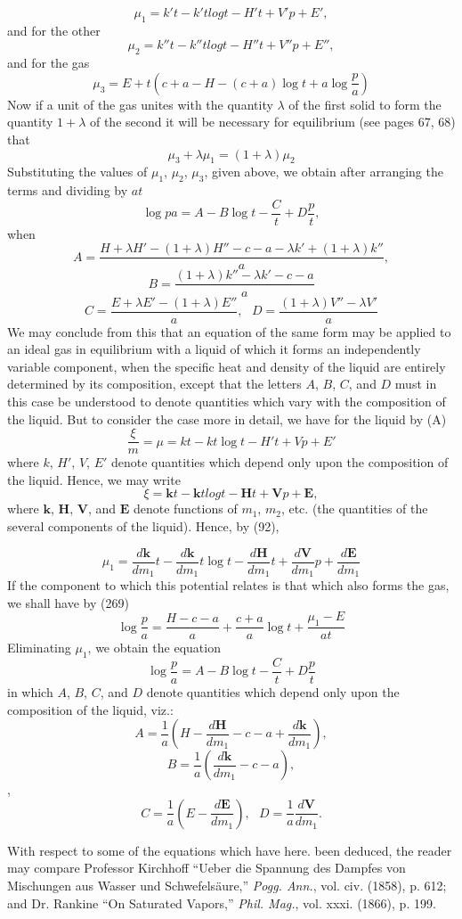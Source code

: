 \documentclass[12pt]{article}
\begin{document}
{$$\mu_1=  k't - k't log t - H't + V'p + E',$$
and for the other    
$$\mu_2= k''t - k''t log t - H''t + V''p + E'',$$
and for the gas      
$$\mu_3= E+t\left(c+a-H-(c+a) \log t+ a \log \frac{p}{a}\right)$$
Now if a unit of the gas unites with the quantity $\lambda$ of the first solid to form the quantity $1 +\lambda $ of the second it will be necessary for equilibrium (see pages 67, 68) that
$$ \mu_3 + \lambda \mu_1=(1 +\lambda) \mu_2$$
Substituting the values of $\mu_1$, $\mu_2$, $\mu_3$, given above, we obtain after arranging the terms and dividing by $at$
$$\log{p}{a} = A -B \log t -\frac{C}{t} + D \frac{p}{t},  $$
when    
$$ A= \frac{H+\lambda H' -(1 + \lambda)H''-c-a-\lambda k' + (1+\lambda)k''}{a},$$
$$B=\frac{(1+\lambda)k''-\lambda k' -c - a}{a}$$
$$C= \frac{E+\lambda E'- (1+\lambda)E''}{a} , \ \ \     D=\frac{(1 +\lambda) V''- \lambda V'}{a}$$
We may conclude from this that an equation of the same form may be applied to an ideal gas in equilibrium with a liquid of which it forms an independently variable component, when the specific heat and density of the liquid are entirely determined by its composition, except that the letters $A$, $B$, $C$, and $D$ must in this case be understood to denote quantities which vary with the composition of the liquid. But to consider the case more in detail, we have for the liquid by (A)
$$\frac{\xi}{m}= \mu = kt - kt \log t - H't + Vp + E'$$
where $k$, $H'$, $V$, $E'$ denote quantities which depend only upon the composition of the liquid. Hence, we may write
$$\xi=\mathbf{k}t - \mathbf{k}t log t - \mathbf{H}t + \mathbf{V}p + \mathbf{E},$$
where $\mathbf{k}$, $\mathbf{H}$, $\mathbf{V}$, and $\mathbf{E}$ denote functions of $m_1$, $m_2$, etc. (the quantities of the several components of the liquid). Hence, by (92),

$$\mu_1 = \frac{d\mathbf{k}}{dm_1 } t- \frac{d\mathbf{k}}{dm_1} t\log t - 
\frac{d\mathbf{H}}{dm_1 } t + \frac{d\mathbf{V}}{dm_1 }p+\frac{d\mathbf{E}}{dm_1 } $$
If the component to which this potential relates is that which also forms the gas, we shall have by (269)
$$\log \frac{p}{a}=\frac{H-c-a}{a} + \frac{c+a}{a} \log t + \frac{\mu_1-E}{at} $$
Eliminating $\mu_1$, we obtain the equation
$$\log\frac{p}{a}=A - B \log t - \frac{C}{t} + D \frac{p}{t}$$
in which $A$, $B$, $C$, and $D$ denote quantities which depend only upon the composition of the liquid, viz.:
$$A =  \frac{1}{a} \left(H- \frac{d\mathbf{H}}{dm_1}-c-a +\frac{d\mathbf{k}}{dm_1}\right),$$
$$B=  \frac{1}{a} \left( \frac{d\mathbf{k}}{dm_1}-c-a\right),$$,
$$C=\frac{1}{a} \left(E - \frac{d\mathbf{E}}{dm_1}\right), \ \ \  D=\frac{1}{a} \frac{d\mathbf{V}}{dm_1}.$$
\par With respect to some of the equations which have here. been deduced, the reader may compare Professor Kirchhoff ``Ueber die Spannung des Dampfes von Mischungen aus Wasser und Schwefelsäure,'' \textit{Pogg. Ann.}, vol. civ. (1858), p. 612; and Dr. Rankine ``On Saturated Vapors,'' \textit{Phil. Mag.}, vol. xxxi. (1866), p. 199.}
\end{document}
